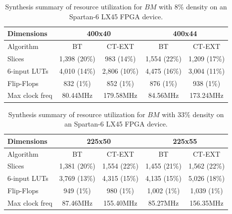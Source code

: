 \documentclass[authoryear,preprint,review,12pt]{elsarticle}
\begin{document}
\begin{table}[htb]
\caption{Synthesis summary of resource utilization for $BM$ with 8\% density on an Spartan-6 LX45 
FPGA device.} \label{table:6}
\begin{center}
    \begin{tabular}{lcccc}   \hline
    	    Dimensions & \multicolumn{2}{c}{400x40} & \multicolumn{2}{c}{400x44} \\ \hline
    	    Algorithm & BT & CT-EXT & BT & CT-EXT \\ \hline
        Slices & 1,398 (20\%) & 983 (14\%) & 1,554 (22\%) & 1,209 (17\%)  \\
        6-input LUTs & 4,010 (14\%) & 2,806 (10\%)& 4,475 (16\%)  & 3,004 (11\%)\\
        Flip-Flops & 832 (1\%) & 852 (1\%) & 876 (1\%) & 938 (1\%)\\
        Max clock freq & 80.44MHz & 179.58MHz & 84.56MHz & 173.24MHz\\ \hline
    \end{tabular}
\end{center}
\end{table}

\begin{table}[htb]
\caption{Synthesis summary of resource utilization for $BM$ with 33\% density on an Spartan-6 LX45 
FPGA device.} \label{table:7}
\begin{center}
    \begin{tabular}{lcccc}   \hline
    	    Dimensions & \multicolumn{2}{c}{225x50} & \multicolumn{2}{c}{225x55} \\ \hline
    	    Algorithm & BT & CT-EXT & BT & CT-EXT \\ \hline 
        Slices & 1,381 (20\%) & 1,554 (22\%) & 1,455 (21\%) & 1,562 (22\%) \\
        6-input LUTs & 3,769 (13\%) & 4,315 (15\%) & 4,135 (15\%) & 5,026 (18\%)\\
        Flip-Flops & 949 (1\%) & 980 (1\%) & 1,002 (1\%) & 1,039 (1\%)\\
        Max clock freq & 87.46MHz & 155.40MHz & 85.27MHz & 156.35MHz\\ \hline
    \end{tabular}
\end{center}
\end{table}

\end{document}
